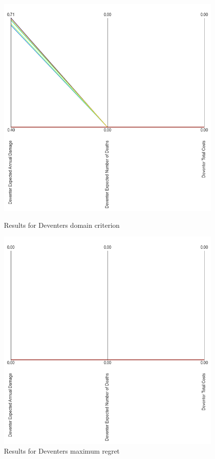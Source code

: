 \begin{figure}[H]
  \centering
  \begin{minipage}[b]{0.4\textwidth}
    \includegraphics[width=1.15\textwidth]{report/figures/results/domain_criterion_Deventer.png}
    \caption{Results for Deventers domain criterion}
    \label{fig:domain_criterion_Deventers}
  \end{minipage}
  \hfill
  \begin{minipage}[b]{0.4\textwidth}
    \includegraphics[width=1.15\textwidth]{report/figures/results/regret_figure_Deventer.png}
    \caption{Results for Deventers maximum regret}
    \label{fig:regret_Deventers}
  \end{minipage}
\end{figure}

